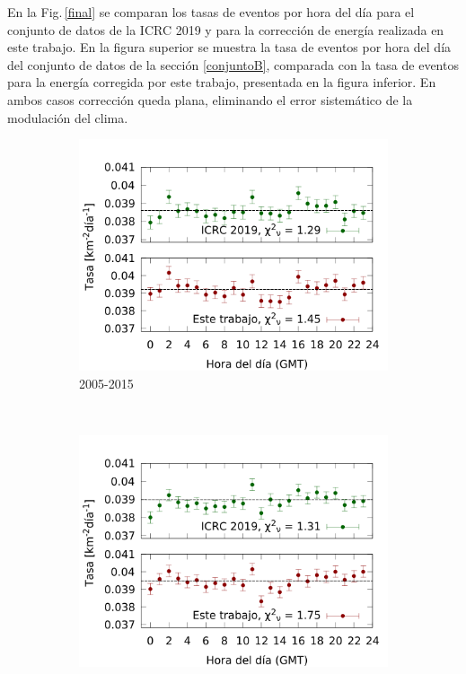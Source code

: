 En la Fig.\,\ref{final} se comparan los tasas de eventos por hora del día para el conjunto de datos de la ICRC 2019 y para la corrección de energía realizada en este trabajo. En la figura superior se muestra la tasa de eventos por hora del día del conjunto de datos de la sección \ref{conjuntoB}, comparada con la tasa de eventos para la energía corregida por este trabajo, presentada en la figura inferior. En ambos casos corrección queda plana, eliminando el error sistemático de la modulación del clima.
        \begin{figure}[H]
            \centering
                \begin{subfigure}[b]{0.5\textwidth}
                \includegraphics[width=\textwidth]{Graphs/2EeV_ICRC_2019_S38_S1000_expected.png}
                \caption{2005-2015} \label{fig:2EeV_expected}
                \end{subfigure}\\
                \begin{subfigure}[b]{0.5\textwidth}
                \includegraphics[width=\textwidth]{Graphs/2EeV_ICRC_2019_S38_S1000_expected_05_18.png}

\end{subfigure}
\end{figure}
